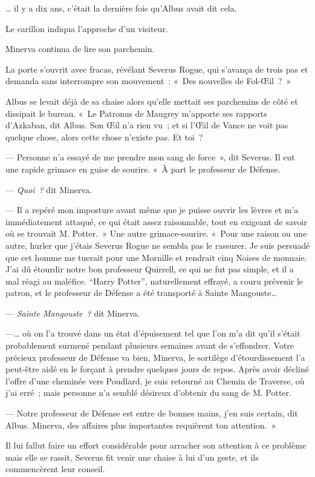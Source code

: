 … il y a dix ans, c'était la dernière fois qu'Albus avait dit cela.

Le carillon indiqua l'approche d'un visiteur.

Minerva continua de lire son parchemin.

La porte s'ouvrit avec fracas, révélant Severus Rogue, qui s'avança de trois pas et demanda sans interrompre son mouvement~: «~Des nouvelles de Fol-Œil~?~»

Albus se levait déjà de sa chaise alors qu'elle mettait ses parchemins de côté et dissipait le bureau.
«~Le Patronus de Maugrey m'apporte ses rapports d'Azkaban, dit Albus.
Son Œil n'a rien vu~; et si l'Œil de Vance ne voit pas quelque chose, alors cette chose n'existe pas.
Et toi~?

--- Personne n'a essayé de me prendre mon sang de force~», dit Severus.
Il eut une rapide grimace en guise de sourire.
«~À part le professeur de Défense.

--- \emph{Quoi~?} dit Minerva.

--- Il a repéré mon imposture avant même que je puisse ouvrir les lèvres et m'a immédiatement attaqué, ce qui était assez raisonnable, tout en exigeant de savoir où se trouvait M. Potter.~»
Une autre grimace-sourire.
«~Pour une raison ou une autre, hurler que j'étais Severus Rogue ne sembla pas le rassurer.
Je suis persuadé que cet homme me tuerait pour une Mornille et rendrait cinq Noises de monnaie.
J'ai dû étourdir notre bon professeur Quirrell, ce qui ne fut pas simple, et il a mal réagi au maléfice.
“Harry Potter”, naturellement effrayé, a couru prévenir le patron, et le professeur de Défense a été transporté à Sainte Mangouste…

--- \emph{Sainte Mangouste~?} dit Minerva.

---… où on l'a trouvé dans un état d'épuisement tel que l'on m'a dit qu'il s'était probablement surmené pendant plusieurs semaines avant de s'effondrer.
Votre précieux professeur de Défense va bien, Minerva, le sortilège d'étourdissement l'a peut-être aidé en le forçant à prendre quelques jours de repos.
Après avoir décliné l'offre d'une cheminée vers Poudlard, je suis retourné au Chemin de Traverse, où j'ai erré~; mais personne n'a semblé désireux d'obtenir du sang de M. Potter.

--- Notre professeur de Défense est entre de bonnes mains, j'en suis certain, dit Albus.
Minerva, des affaires plus importantes requièrent ton attention.~»

Il lui fallut faire un effort considérable pour arracher son attention à ce problème mais elle se rassit, Severus fit venir une chaise à lui d'un geste, et ils commencèrent leur conseil.


